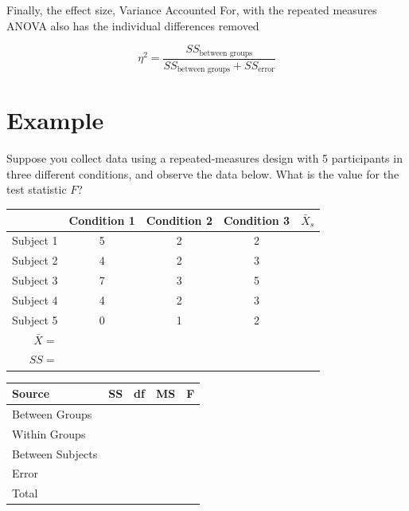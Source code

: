 \documentclass{tufte-handout}
\begin{document}
Finally, the effect size, Variance Accounted For, with the repeated measures ANOVA also has the individual differences removed

\begin{equation*}
\eta^2 = \frac{SS_{\text{between groups}}}{SS_{\text{between groups}}+SS_{\text{error}}}
\end{equation*}

\pagebreak
\section{Example}

\begin{fullwidth}
Suppose you collect data using a repeated-measures design with 5 participants in three different conditions, and observe the data below. What is the value for the test statistic $F$?

\begin{table}
  \centering
  \selectfont
  \begin{tabular}{rcccc}
    \toprule
    & Condition 1 & Condition 2 & Condition 3 & $\bar{X}_s$\\
    \midrule
Subject 1&	5&	2&	2&\\
Subject 2&	4&	2&	3&\\
Subject 3&	7&	3&	5&\\
Subject 4&	4&	2&	3&\\
Subject 5&	0&	1&	2&\\
\midrule
$\bar{X}=$&&&\\
$SS=$&&&\\
    \bottomrule
  \end{tabular}
  \label{tab:normaltab}
\end{table}

\vspace{4.25 in}

\begin{table}
  \centering
  \selectfont
  \begin{tabular}{lllll}
    \toprule
    Source & \qquad SS & \qquad df & \qquad MS & \qquad F \\
    \midrule
    Between Groups & & & & \\
    Within Groups & & & & \\
\qquad Between Subjects & & & & \\
\qquad Error & & & & \\
    Total & & & & \\
    \bottomrule
  \end{tabular}
  \label{tab:normaltab}
\end{table}
\end{fullwidth}
\end{document}
